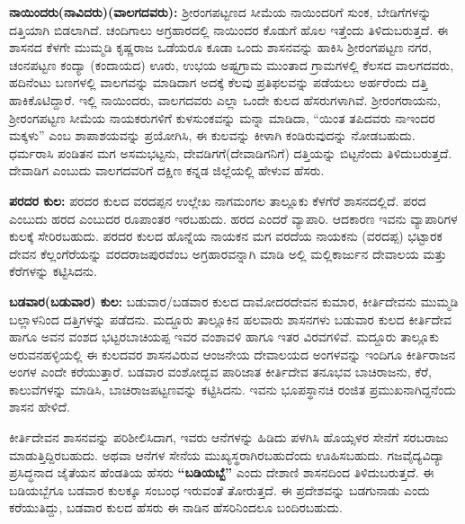 \textbf{ನಾಯಿಂದರು(ನಾವಿದರು)(ವಾಲಗದವರು):} ಶ‍್ರೀರಂಗಪಟ್ಟಣದ ಸೀಮೆಯ ನಾಯಿಂದರಿಗೆ ಸುಂಕ, ಬೇಡಿಗೆಗಳನ್ನು ದತ್ತಿಯಾಗಿ ಬಿಡಲಾಗಿದೆ. ಚಂದಿಗಾಲು ಅಗ್ರಹಾರದಲ್ಲಿ ನಾಯಿಂದರ ಕೊಡುಗೆ ಹೊಲ ಇತ್ತೆಂದು ತಿಳಿದುಬರುತ್ತದೆ. ಈ ಶಾಸನದ ಕೆಳಗೇ ಮುಮ್ಮಡಿ ಕೃಷ್ಣರಾಜ ಒಡೆಯರೂ ಕೂಡಾ ಒಂದು ಶಾಸನವನ್ನು ಹಾಕಿಸಿ ಶ‍್ರೀರಂಗಪಟ್ಟಣ ನಗರ, ಚಂನಪಟ್ಟಣ ಕಂದ್ಯಾ (ಕಂದಾಯದ) ಊರು, ಉಭಯ ಅಷ್ಟಗ್ರಾಮ ಮುಂತಾದ ಗ್ರಾಮಗಳಲ್ಲಿ ಕೆಲಸದ ವಾಲಗದವರು, ಹದಿನೆಂಟು ಬಣಗಳಲ್ಲಿ ವಾಲಗವನ್ನು ಮಾಡಿದಾಗ ಅದಕ್ಕೆ ಕೆಲವು ಪ್ರತಿಫಲವನ್ನು ಪಡೆಯಲು ಅರ್ಹರೆಂದು ದತ್ತಿ ಹಾಕಿಕೊಟಿದ್ದಾರೆ. ಇಲ್ಲಿ ನಾಯಿಂದರು, ವಾಲಗದವರು ಎಲ್ಲಾ ಒಂದೇ ಕುಲದ ಹೆಸರುಗಳಾಗಿವೆ. ಶ‍್ರೀರಂಗರಾಯನು, ಶ‍್ರೀರಂಗಪಟ್ಟಣ ಸೀಮೆಯ ನಾಯಕರುಗಳಿಗೆ ಕುಳಸುಂಕವನ್ನು ಮನ್ನಾ ಮಾಡಿದಾ, “ಯಿಂತ ತಪಿದವರು ನಾಇಂದರ ಮಕ್ಕಳು” ಎಂಬ ಶಾಪಾಶಯವನ್ನು ಪ್ರಯೋಗಿಸಿ, ಈ ಕುಲವನ್ನು ಕೀಳಾಗಿ ಕಂಡಿರುವುದನ್ನು ನೋಡಬಹುದು. ಧರ್ಮರಾಸಿ ಪಂಡಿತನ ಮಗ ಅಸಮಭಟ್ಟನು, ದೇವಡಿಗಗೆ(ದೇವಾಡಿಗನಿಗೆ) ದತ್ತಿಯನ್ನು ಬಿಟ್ಟನೆಂದು ತಿಳಿದುಬರುತ್ತದೆ. ದೇವಾಡಿಗ ಎಂಬುದು ವಾಲಗದವರಿಗೆ ದಕ್ಷಿಣ ಕನ್ನಡ ಜಿಲ್ಲೆಯಲ್ಲಿ ಹೇಳುವ ಹೆಸರು.

\textbf{ಪರದರ ಕುಲ:} ಪರದರ ಕುಲದ ವರದಪ್ಪನ ಉಲ್ಲೇಖ ನಾಗಮಂಗಲ ತಾಲ್ಲೂಕು ಕೆಳಗೆರೆ ಶಾಸನದಲ್ಲಿದೆ. ಪರದ ಎಂಬುದು ಹರದ ಎಂಬುದರ ರೂಪಾಂತರ ಇರಬಹುದು. ಹರದ ಎಂದರೆ ವ್ಯಾಪಾರಿ. ಆದಕಾರಣ ಇವನು ವ್ಯಾಪಾರಿಗಳ ಕುಲಕ್ಕೆ ಸೇರಿರಬಹುದು. ಪರದರ ಕುಲದ ಹೊನ್ನೆಯ ನಾಯಕನ ಮಗ ವರದೆಯ ನಾಯಕನು (ವರದಪ್ಪ) ಭಟ್ಟಾರಕ ದೇವನ ಕೆಲ್ಲಂಗೆರೆಯನ್ನು ವರದರಾಜಪುರವೆಂಬ ಅಗ್ರಹಾರವನ್ನಾಗಿ ಮಾಡಿ ಅಲ್ಲಿ ಮಲ್ಲಿಕಾರ್ಜುನ ದೇವಾಲಯ ಮತ್ತು ಕೆರೆಗಳನ್ನು ಕಟ್ಟಿಸಿದನು.

\textbf{ಬಡವಾರ(ಬಡುವಾರ) ಕುಲ: } ಬಡುವಾರ/ಬಡವಾರ ಕುಲದ ದಾಮೋದರದೇವನ ಕುಮಾರ, ಕೀರ್ತಿದೇವನು ಮುಮ್ಮಡಿ ಬಲ್ಲಾಳನಿಂದ ದತ್ತಿಗಳನ್ನು ಪಡೆದನು. ಮದ್ದೂರು ತಾಲ್ಲೂಕಿನ ಹಲವಾರು ಶಾಸನಗಳು ಬಡುವಾರ ಕುಲದ ಕೀರ್ತಿದೇವ ಹಾಗೂ ಅವನ ವಂಶದ ಭಟ್ಟರಬಾಚಿಯಪ್ಪ ಇವರ ವಂಶಾವಳಿ ಹಾಗೂ ಇತರ ವಿರವಗಳಿವೆ. ಮದ್ದೂರು ತಾಲ್ಲೂಕು ಅರುವನಹಳ್ಳಿಯಲ್ಲಿ ಈ ಕುಲದವರ ಶಾಸನವಿರುವ ಆಂಜನೇಯ ದೇವಾಲಯದ ಅಂಗಳವನ್ನು ಇಂದಿಗೂ ಕೀರ್ತಿರಾಜನ ಅಂಗಳ ಎಂದೇ ಕರೆಯುತ್ತಾರೆ. ಬಡವಾರ ವಂಶೋದ್ಭವ ಪಾರಿಜಾತ ಕೀರ್ತಿದೇವ ತನೂಭವ ಬಾಚಿರಾಜನು, ಕೆರೆ, ಕಾಲುವೆಗಳನ್ನು ಮಾಡಿಸಿ, ಬಾಚಿರಾಜಪಟ್ಟಣವನ್ನು ಕಟ್ಟಿಸಿದನು. ಇವನು ಭೂಪಸ್ಥಾನಚಿ ರಂಜಿತ ಪ್ರಮುಖನಾಗಿದ್ದನೆಂದು ಶಾಸನ ಹೇಳಿದೆ.

ಕೀರ್ತಿದೇವನ ಶಾಸನವನ್ನು ಪರಿಶೀಲಿಸಿದಾಗ, ಇವರು ಆನೆಗಳನ್ನು ಹಿಡಿದು ಪಳಗಿಸಿ ಹೊಯ್ಸಳರ ಸೇನೆಗೆ ಸರಬರಾಜು ಮಾಡುತ್ತಿದ್ದಿರಬಹುದು. ಅಥವಾ ಆನೆಗಳ ಸೇನೆಯ ಮುಖ್ಯಸ್ಥರಾಗಿರಬಹುದೆಂದು ಊಹಿಸಬಹುದು. ಗಜವೈದ್ಯವಿದ್ಯಾ ಪ್ರಸಿದ್ಧನಾದ ಜೈತೆಯನ ಹೆಂಡತಿಯ ಹೆಸರು \textbf{“ಬಡಿಯಬ್ಬೆ”} ಎಂದು ದೇಶಾಣಿ ಶಾಸನದಿಂದ ತಿಳಿದುಬರುತ್ತದೆ. ಈ ಬಡಿಯಬ್ಬೆಗೂ ಬಡವಾರ ಕುಲಕ್ಕೂ ಸಂಬಂಧ ಇರುವಂತೆ ತೋರುತ್ತದೆ. ಈ ಪ್ರದೇಶವನ್ನು ಬಡಗುನಾಡು ಎಂದು ಕರೆಯುತಿದ್ದು, ಬಡವಾರ ಕುಲದ ಹೆಸರು ಈ ನಾಡಿನ ಹೆಸರಿನಿಂದಲೂ ಬಂದಿರಬಹುದು.


